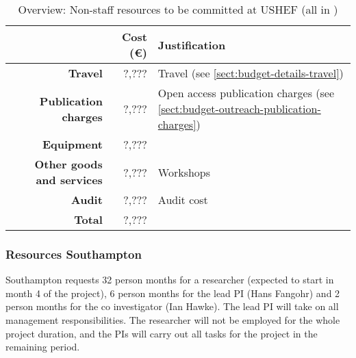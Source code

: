 \bigskip
\begin{table}[H]
\begin{tabular}{|r|r|p{9cm}|}
\hline
\textbf{} & \textbf{Cost (\euro)} & \textbf{Justification} \\\hline
\textbf{Travel} & ?,??? & Travel (see \ref{sect:budget-details-travel})\\\hline
\textbf{Publication charges} & ?,??? & Open access publication charges (see \ref{sect:budget-outreach-publication-charges})\\\hline
\textbf{Equipment} & ?,??? &  \\\hline    %

\textbf{Other goods and services} & ?,??? & Workshops \\\hline   %
\textbf{Audit} & ?,??? & Audit cost \\\hline
\textbf{Total} & ?,???\\\cline{1-2}
\end{tabular}
\caption{Overview: Non-staff resources to be committed at USHEF (all in \texteuro)}\vspace*{-1em}
\end{table}





\subsubsection{Resources Southampton}

Southampton requests 32 person months for a researcher (expected to
start in month 4 of the project), 6 person months for the lead PI
(Hans Fangohr) and 2 person months for the co investigator (Ian
Hawke). The lead PI will take on all management responsibilities. The
researcher will not be employed for the whole project duration, and
the PIs will carry out all tasks for the project in the remaining
period.

